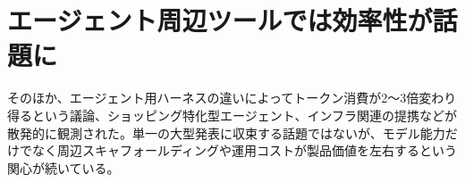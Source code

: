 \section{エージェント周辺ツールでは効率性が話題に}
そのほか、エージェント用ハーネスの違いによってトークン消費が2〜3倍変わり得るという議論、ショッピング特化型エージェント、インフラ関連の提携などが散発的に観測された。単一の大型発表に収束する話題ではないが、モデル能力だけでなく周辺スキャフォールディングや運用コストが製品価値を左右するという関心が続いている。
